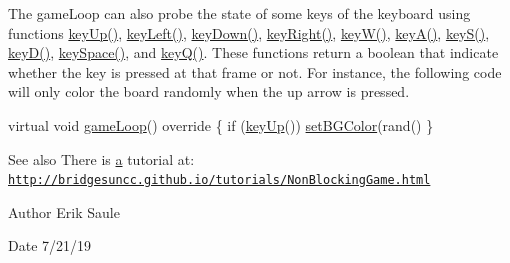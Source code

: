 The game\+Loop can also probe the state of some keys of the keyboard using functions \hyperlink{classbridges_1_1game_1_1_non_blocking_game_a0a93cf74e7eac55c33f76cd55d525084}{key\+Up()}, \hyperlink{classbridges_1_1game_1_1_non_blocking_game_a9b7ba679dd177b28f84ea24b9924a51c}{key\+Left()}, \hyperlink{classbridges_1_1game_1_1_non_blocking_game_a52dd79aaaee9da77fa392fb8ec37fa94}{key\+Down()}, \hyperlink{classbridges_1_1game_1_1_non_blocking_game_afbea1fa2acec16e952be66ce76d496a9}{key\+Right()}, \hyperlink{classbridges_1_1game_1_1_non_blocking_game_a7bd5c2ab845e24525649dda7f8dfd460}{key\+W()}, \hyperlink{classbridges_1_1game_1_1_non_blocking_game_af88089437e34df580b247cb27047fd14}{key\+A()}, \hyperlink{classbridges_1_1game_1_1_non_blocking_game_a75ece5d4fa35893ecacc82c5064c05e0}{key\+S()}, \hyperlink{classbridges_1_1game_1_1_non_blocking_game_a932979445cc8acea618092b83b4a9756}{key\+D()}, \hyperlink{classbridges_1_1game_1_1_non_blocking_game_a54beca154b58b0e0fb26c75983ba5072}{key\+Space()}, and \hyperlink{classbridges_1_1game_1_1_non_blocking_game_af0dafefbad315fbfb01851a4a0dfa93e}{key\+Q()}. These functions return a boolean that indicate whether the key is pressed at that frame or not. For instance, the following code will only color the board randomly when the up arrow is pressed.


\begin{DoxyCode}
\textcolor{keyword}{virtual} \textcolor{keywordtype}{void} \hyperlink{classbridges_1_1game_1_1_game_base_a16fb787bc65be1a582cddcfba3a0c5bb}{gameLoop}()\textcolor{keyword}{ override }\{
  \textcolor{keywordflow}{if} (\hyperlink{classbridges_1_1game_1_1_non_blocking_game_a0a93cf74e7eac55c33f76cd55d525084}{keyUp}())
    \hyperlink{classbridges_1_1game_1_1_game_base_ab667bbca1c81e5fb3aa8d81d70fe8cd2}{setBGColor}(rand()%
\}
\end{DoxyCode}


\begin{DoxySeeAlso}{See also}
There is \hyperlink{namespacebridges_1_1game_ab9a19c7ab6e2ebac2f95180e21733487a0cc175b9c0f1b6a831c399e269772661}{a} tutorial at\+: \href{http://bridgesuncc.github.io/tutorials/NonBlockingGame.html}{\tt http\+://bridgesuncc.\+github.\+io/tutorials/\+Non\+Blocking\+Game.\+html}
\end{DoxySeeAlso}
\begin{DoxyAuthor}{Author}
Erik Saule 
\end{DoxyAuthor}
\begin{DoxyDate}{Date}
7/21/19 
\end{DoxyDate}
